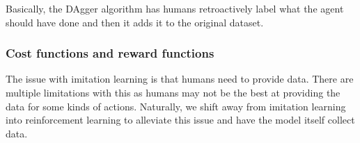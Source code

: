 Basically, the DAgger algorithm has humans retroactively label what the agent should have done and then it adds it to the original dataset.

\subsubsection{Cost functions and reward functions}
The issue with imitation learning is that humans need to provide data. There are multiple limitations with this as humans may not be the best at providing the data for some kinds of actions. Naturally, we shift away from imitation learning into reinforcement learning to alleviate this issue and have the model itself collect data.